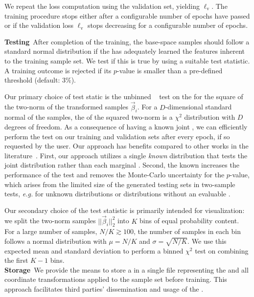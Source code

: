 \documentclass[aps,nofootinbib,superscriptaddress,reprint,preprintnumbers]{revtex4-1}
\newcommand{\eg}{\textit{e.g.}\xspace}
\newcommand{\pvalue}{$p$-value\xspace}
\begin{document}
We repeat the loss computation using the validation set, yielding $\ell_\text{v}$.
The training procedure stops either after a configurable number of epochs have passed or if the validation loss $\ell_\text{v}$ stops decreasing for
a configurable number of epochs.
\\

\noindent


\textbf{Testing}~After completion of the training, the base-space samples should follow a standard normal distribution
if the \LM has adequately learned the features inherent to the training sample set.
We test if this is true by using a suitable test statistic.
A training outcome is rejected if its \pvalue is smaller than a pre-defined threshold (default: $3\%$).

Our primary choice of test static is the unbinned \KS~\cite{kstest} test on the \PDF for the square of the two-norm of the transformed samples $\vec\beta_i$.
For a $D$-dimensional standard normal \PDF of the samples, the \PDF of the squared two-norm is a $\chi^2$ distribution with $D$ degrees of freedom.
As a consequence of having a known joint \PDF, we can efficiently perform the \KS test on our training and validation sets after every epoch,
if so requested by the user.
Our approach has benefits compared to other works in the literature~\cite{Reyes-Gonzalez:2023oei}.
First, our approach utilizes a single \emph{known} distribution that tests the joint distribution rather than each marginal \PDF.
Second, the known \CDF increases the performance of the \KS test and removes the Monte-Carlo uncertainty for the \pvalue,
which arises from the limited size of the generated testing sets in two-sample tests, \eg for unknown distributions or distributions
without an evaluable \CDF.


Our secondary choice of the test statistic is primarily intended for visualization: we split the two-norm samples $||\vec\beta_i||_2^2$ into $K$ bins of equal probability content.
For a large number of samples, $N / K \gtrsim 100$,
the number of samples in each bin follows a normal distribution with $\mu = N / K$ and $\sigma = \sqrt{N / K}$.
We use this expected mean and standard deviation to perform a binned $\chi^2$ test on combining the first $K-1$ bins.
\\

\noindent
\textbf{Storage}~We provide the means to store a \LM in a single file
representing the \NF and all coordinate transformations applied to the sample set before training.
This approach facilitates third parties' dissemination and usage of the \LM.
\end{document}
